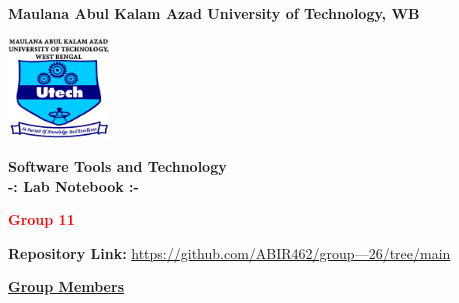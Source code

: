 \documentclass[a4paper,12pt]{article}
\begin{document}
\begin{titlepage}
    \centering
    \vspace*{0 cm}
    \LARGE
    \textbf{Maulana Abul Kalam Azad University of Technology, WB}
    \vspace{0.5cm}
    
    \includegraphics[width=0.2\textwidth]{makaut.png} %
    \vspace{0.5cm}
    
    \Large
    \textbf{\textcolor{blue!60}{Software Tools and Technology\\
        -: Lab Notebook :-}}
    \vspace{0.5cm}
    
    \large
    \textbf{\textcolor{red}{Group 11}}
    \vspace{1 cm}
    
    \textbf{Repository Link:} \href{https://github.com/ABIR462/group---26/tree/main}{https://github.com/ABIR462/group---26/tree/main}
    \vspace{1cm}
    
    \textbf{\underline{\textcolor{blue!60}{Group Members}}}
    \vspace{0.5cm}


\end{titlepage}
\end{document}
